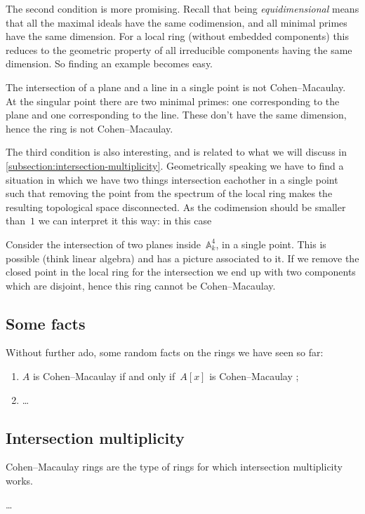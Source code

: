 \documentclass[10pt,a4paper]{article}
\begin{document}
The second condition is more promising. Recall that being \emph{equidimensional} means that all the maximal ideals have the same codimension, and all minimal primes have the same dimension. For a local ring (without embedded components) this reduces to the geometric property of all irreducible components having the same dimension. So finding an example becomes easy.
\begin{example}
  The intersection of a plane and a line in a single point is not Cohen--Macaulay. At the singular point there are two minimal primes: one corresponding to the plane and one corresponding to the line. These don't have the same dimension, hence the ring is not Cohen--Macaulay.
\end{example}

The third condition is also interesting, and is related to what we will discuss in \cref{subsection:intersection-multiplicity}. Geometrically speaking we have to find a situation in which we have two things intersection eachother in a single point such that removing the point from the spectrum of the local ring makes the resulting topological space disconnected. As the codimension should be smaller than~$1$ we can interpret it this way: in this case 
\begin{example}
  Consider the intersection of two planes inside~$\mathbb{A}_k^4$, in a single point. This is possible (think linear algebra) and has a picture associated to it. If we remove the closed point in the local ring for the intersection we end up with two components which are disjoint, hence this ring cannot be Cohen--Macaulay.
\end{example}

\subsection{Some facts}
Without further ado, some random facts on the rings we have seen so far:
\begin{enumerate}
  \item $A$ is Cohen--Macaulay if and only if~$A[x]$ is Cohen--Macaulay \cite[proposition 18.9]{eisenbud-commutative-algebra};
  \item \ldots
\end{enumerate}


\subsection{Intersection multiplicity}
Cohen--Macaulay rings are the type of rings for which intersection multiplicity works.
\begin{example}
  \ldots
\end{example}
\end{document}
